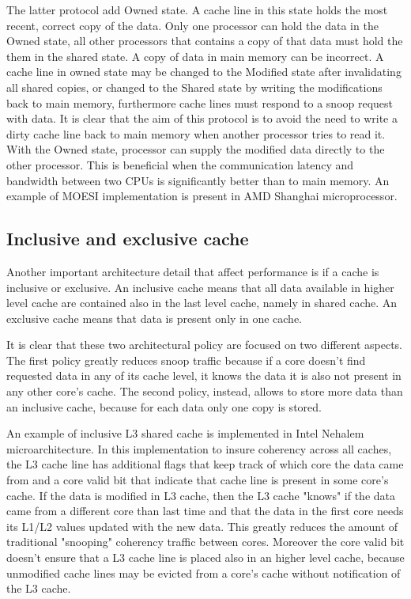 The latter protocol add Owned state. A cache line in this state holds the most recent, correct copy of the data. Only one processor can hold the data 
in the Owned state, all other processors that contains a copy of that data must hold the them in the shared state. A copy of data in main memory can be 
incorrect. A cache line in owned state may be changed to the Modified state after invalidating all shared copies, or changed to the Shared state by 
writing the modifications back to main memory, furthermore cache lines must respond to a snoop request with data. 
It is clear that the aim of this protocol is to avoid the need to write a dirty cache line back to main memory when another processor tries to read it. 
With the Owned state, processor can supply the modified data directly to the other processor. This is beneficial when the communication latency and 
bandwidth between two CPUs is significantly better than to main memory. An example of MOESI implementation is present in AMD Shanghai microprocessor.

\subsection{Inclusive and exclusive cache}

Another important architecture detail that affect performance is if a cache is inclusive or exclusive.
An inclusive cache means that all data available in higher level cache are contained also in the last level cache, namely in shared cache.
An exclusive cache means that data is present only in one cache.

It is clear that these two architectural policy are focused on two different aspects. The first policy greatly reduces snoop traffic because if a core 
doesn't find requested data in any of its cache level, it knows the data it is also not present in any other core's cache. The second policy, instead, 
allows to store more data than an inclusive cache, because for each data only one copy is stored.

An example of inclusive L3 shared cache is implemented in Intel Nehalem microarchitecture. In this implementation to insure coherency across 
all caches, the L3 cache line has additional flags that keep track of which core the data came from and a core valid bit that indicate that cache line 
is present in some core's cache. If the data is modified in L3 cache, then the L3 cache "knows" if the data came from a different core than last time 
and that the data in the first core needs its L1/L2 values updated with the new data. This greatly reduces the amount of traditional "snooping"
coherency traffic between cores. Moreover the core valid bit doesn't ensure that a L3 cache line is placed also in an higher level cache, because unmodified
cache lines may be evicted from a core's cache without notification of the L3 cache.

